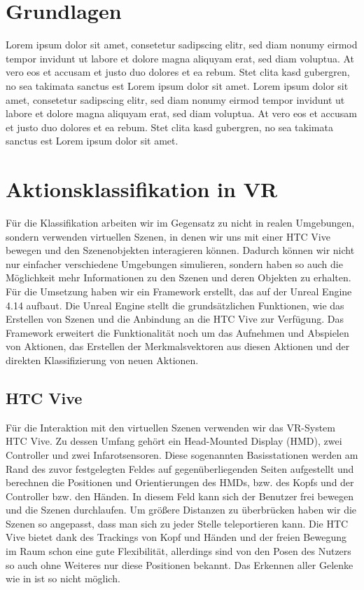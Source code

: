 
\section{Grundlagen}

Lorem ipsum dolor sit amet, consetetur sadipscing elitr, sed diam nonumy eirmod tempor invidunt ut labore et dolore magna aliquyam erat, sed diam voluptua. At vero eos et accusam et justo duo dolores et ea rebum. Stet clita kasd gubergren, no sea takimata sanctus est Lorem ipsum dolor sit amet. Lorem ipsum dolor sit amet, consetetur sadipscing elitr, sed diam nonumy eirmod tempor invidunt ut labore et dolore magna aliquyam erat, sed diam voluptua. At vero eos et accusam et justo duo dolores et ea rebum. Stet clita kasd gubergren, no sea takimata sanctus est Lorem ipsum dolor sit amet.


\section{Aktionsklassifikation in VR}

Für die Klassifikation arbeiten wir im Gegensatz zu \cite{SceneGronk} nicht in realen Umgebungen, sondern verwenden virtuellen Szenen, in denen wir uns mit einer HTC Vive \cite{HTC-Vive} bewegen und den Szenenobjekten interagieren können. Dadurch können wir nicht nur einfacher verschiedene Umgebungen simulieren, sondern haben so auch die Möglichkeit mehr Informationen zu den Szenen und deren Objekten zu erhalten.
Für die Umsetzung haben wir ein Framework erstellt, das auf der Unreal Engine 4.14 \cite{UE4} aufbaut. Die Unreal Engine stellt die grundsätzlichen Funktionen, wie das Erstellen von Szenen und die Anbindung an die HTC Vive zur Verfügung. Das Framework erweitert die Funktionalität noch um das Aufnehmen und Abspielen von Aktionen, das Erstellen der Merkmalsvektoren aus diesen Aktionen \cite{Features} und der direkten Klassifizierung von neuen Aktionen.

\subsection{HTC Vive}
Für die Interaktion mit den virtuellen Szenen verwenden wir das VR-System HTC Vive. Zu dessen Umfang gehört ein Head-Mounted Display (HMD), zwei Controller und zwei Infarotsensoren. Diese sogenannten Basisstationen werden am Rand des zuvor festgelegten Feldes auf gegenüberliegenden Seiten aufgestellt und berechnen die Positionen und Orientierungen des HMDs, bzw. des Kopfs und der Controller bzw. den Händen. In diesem Feld kann sich der Benutzer frei bewegen und die Szenen durchlaufen. Um größere Distanzen zu überbrücken haben wir die Szenen so angepasst, dass man sich zu jeder Stelle teleportieren kann. Die HTC Vive bietet dank des Trackings von Kopf und Händen und der freien Bewegung im Raum schon eine gute Flexibilität, allerdings sind von den Posen des Nutzers so auch ohne Weiteres nur diese Positionen bekannt. Das Erkennen aller Gelenke wie in \cite{SceneGronk} ist so nicht möglich. \cite{FutureWork}

